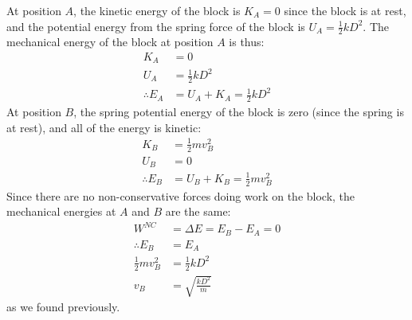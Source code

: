 \begin{example}
At position $A$, the kinetic energy of the block is $K_A=0$ since the block is at rest, and the potential energy from the spring force of the block is $U_A=\frac{1}{2}kD^2$. The mechanical energy of the block at position $A$ is thus:
\begin{align*}
K_A&=0\\
U_A&=\frac{1}{2}kD^2\\
\therefore E_A &= U_A + K_A = \frac{1}{2}kD^2
\end{align*}
At position $B$, the spring potential energy of the block is zero (since the spring is at rest), and all of the energy is kinetic:
\begin{align*}
K_B&=\frac{1}{2}mv_B^2\\
U_B&=0\\
\therefore E_B &= U_B+K_B=\frac{1}{2}mv_B^2
\end{align*}
Since there are no non-conservative forces doing work on the block, the mechanical energies at $A$ and $B$ are the same:
\begin{align*}
W^{NC}&=\Delta E=E_B-E_A= 0\\
\therefore E_B&=E_A\\
\frac{1}{2}mv_B^2&= \frac{1}{2}kD^2\\
 v_B &= \sqrt{\frac{kD^2}{m}}
\end{align*}
as we found previously.
\end{example}
\vspace{-0.25cm}
